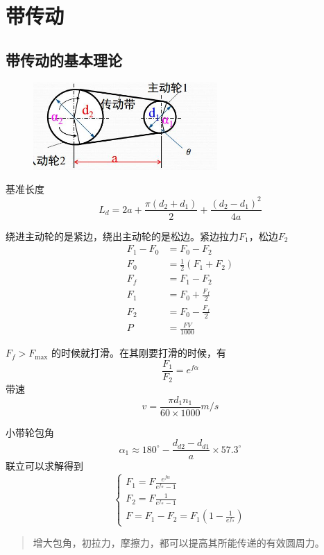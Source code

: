 \documentclass[twocolumn]{ctexart}
\begin{document}
\section{带传动}
\subsection{带传动的基本理论}
        \begin{figure}[H]
            \centering
            \includegraphics[width=7cm]{img/16.png}
            \end{figure}
基准长度
$$ L_{d}=2a+ \frac{\pi(d_{2}+d_{1})}{2}+ \frac{(d_{2}-d_{1})^{2}}{4a} $$

绕进主动轮的是紧边，绕出主动轮的是松边。紧边拉力$F_1$，松边$F_2$
\begin{align*}
F_1-F_0&=F_0-F_2\\
F_0&=\frac{1}{2}(F_1+F_2)\\
F_f&=F_1-F_2\\
F_1&=F_0+\frac{F_f}{2}\\
F_2&=F_0-\frac{F_f}{2}\\
P&=\frac{FV}{1000}
\end{align*}

$F_f>F_{\max}$ 的时候就打滑。在其刚要打滑的时候，有
$$
\frac{F_1}{F_2}=e^{f\alpha}
$$
带速
$$ v= \frac{\pi d_{1}n_{1}}{60 \times 1000}m/s $$

小带轮包角
$$  \alpha _{1}\approx 180^{\circ}- \frac{d_{d2}-d_{d1}}{a}\times 57.3^{\circ} $$
联立可以求解得到
$$\left\{ \begin{matrix}  F_{1}=F \frac{e^{f \alpha}}{e^{f_{\alpha}}-1}  \\  F_{2}=F \frac{1}{e^{f_{\alpha}}-1}  \\  F=F_{1}-F_{2}=F_{1}(1- \frac{1}{e^{f_{\alpha}}})  \end{matrix} \right.$$

\begin{quote}
{\qquad{}\ccwd\kaishu{}
增大包角，初拉力，摩擦力，都可以提高其所能传递的有效圆周力。
}
\end{quote}
\end{document}
